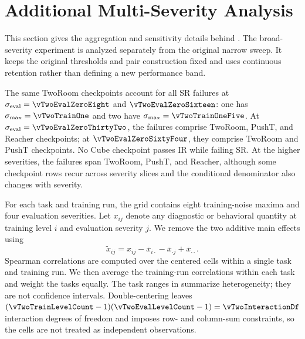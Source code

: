 \section{Additional Multi-Severity Analysis}
\label{sec:appendix-multiseverity}

\providecommand{\vTwoNumberMacros}{paper1_v2_high_severity_draft/tables/multiseverity_numbers}

\providecommand{\vTwoAssociationTable}{tables/table_multiseverity_associations}

This section gives the aggregation and sensitivity details behind
. The broad-severity experiment is
analyzed separately from the original narrow sweep. It keeps the original
thresholds and pair construction fixed and uses continuous retention rather
than defining a new performance band.

The same \vTwoVetoAtZeroEight{} TwoRoom checkpoints account for all SR failures at
$\sigma_{\mathrm{eval}}=\vTwoEvalZeroEight$ and
$\vTwoEvalZeroSixteen$: one has $\sigma_{\max}=\vTwoTrainOne$ and two have
$\sigma_{\max}=\vTwoTrainOneFive$. At
$\sigma_{\mathrm{eval}}=\vTwoEvalZeroThirtyTwo$, the failures comprise
\vTwoVetoThirtyTwoTwoRoom{} TwoRoom, \vTwoVetoThirtyTwoPushT{} PushT, and
\vTwoVetoThirtyTwoReacher{} Reacher checkpoints; at
$\vTwoEvalZeroSixtyFour$, they comprise
\vTwoVetoSixtyFourTwoRoom{} TwoRoom and \vTwoVetoSixtyFourPushT{} PushT
checkpoints. No Cube checkpoint passes IR while failing SR. At the higher
severities, the failures span TwoRoom, PushT, and Reacher, although some
checkpoint rows recur across severity slices and the conditional denominator
also changes with severity.

For each task and training run, the grid contains eight training-noise maxima
and four evaluation severities. Let $x_{ij}$ denote any diagnostic or behavioral
quantity at training level $i$ and evaluation severity $j$. We remove the two
additive main effects using
\[
\widetilde{x}_{ij}
=x_{ij}-\overline{x}_{i\cdot}-\overline{x}_{\cdot j}
+\overline{x}_{\cdot\cdot}.
\]
Spearman correlations are computed over the \vTwoFactorialCellCount{} centered
cells within a single task and training run. We then average the
\vTwoRunCount{} training-run correlations within each task and weight the
\vTwoTaskCount{} tasks equally. The task ranges in
 summarize heterogeneity; they are not
confidence intervals. Double-centering leaves
$(\vTwoTrainLevelCount-1)(\vTwoEvalLevelCount-1)=\vTwoInteractionDf$
interaction degrees of freedom and imposes row- and column-sum constraints, so
the \vTwoFactorialCellCount{} cells are not treated as independent observations.

